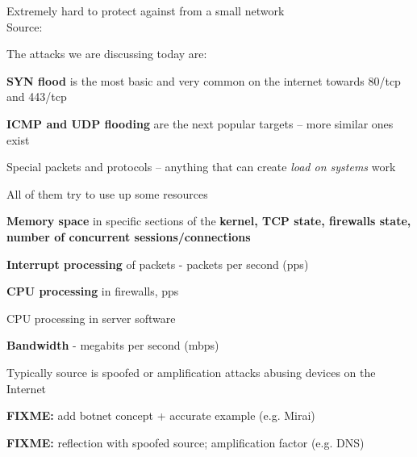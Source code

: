 \documentclass[Screen16to9,17pt]{foils}
\begin{document}


Extremely hard to protect against from a small network\\
Source: 


The attacks we are discussing today are:
\begin{list2}
\item {\bf SYN flood} is the most basic and very common on the internet towards 80/tcp and 443/tcp
\item {\bf ICMP and UDP flooding} are the next popular targets -- more similar ones exist
\item Special packets and protocols -- anything that can create \emph{load on systems} work
\item All of them try to use up some resources
\begin{list2}
\item {\bf Memory space} in specific sections of the {\bf kernel, TCP state, firewalls state, number of concurrent sessions/connections}
\item {\bf Interrupt processing} of packets - packets per second (pps)
\item {\bf CPU processing} in firewalls, pps
\item CPU processing in server software
\item {\bf Bandwidth} - megabits per second (mbps)
\item Typically source is spoofed or amplification attacks abusing devices on the Internet
\end{list2}
\end{list2}

\begin{list2}
\item \textbf{FIXME:} add botnet concept + accurate example (e.g. Mirai)
\end{list2}

\begin{list2}
\item \textbf{FIXME:} reflection with spoofed source; amplification factor (e.g. DNS)
\end{list2}
\end{document}
